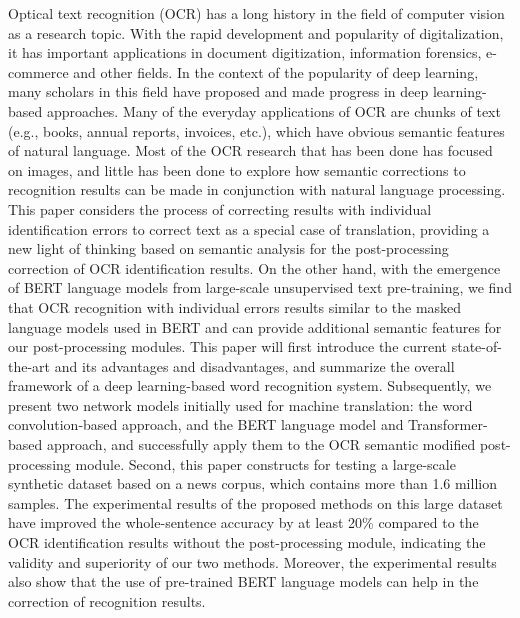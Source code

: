 \begin{englishabstract}
Optical text recognition (OCR) has a long history in the field of computer vision as a research topic.
With the rapid development and popularity of digitalization, it has important applications in document digitization, information forensics, e-commerce and other fields.
In the context of the popularity of deep learning, many scholars in this field have proposed and made progress in deep learning-based approaches.
Many of the everyday applications of OCR are chunks of text (e.g., books, annual reports, invoices, etc.), which have obvious semantic features of natural language.
Most of the OCR research that has been done has focused on images, and little has been done to explore how semantic corrections to recognition results can be made in conjunction with natural language processing.
This paper considers the process of correcting results with individual identification errors to correct text as a special case of translation, providing a new light of thinking based on semantic analysis for the post-processing correction of OCR identification results.
On the other hand, with the emergence of BERT language models from large-scale unsupervised text pre-training, we find that OCR recognition with individual errors results similar to the masked language models used in BERT and can provide additional semantic features for our post-processing modules.
This paper will first introduce the current state-of-the-art and its advantages and disadvantages, and summarize the overall framework of a deep learning-based word recognition system.
Subsequently, we present two network models initially used for machine translation: the word convolution-based approach, and the BERT language model and Transformer-based approach, and successfully apply them to the OCR semantic modified post-processing module.
Second, this paper constructs for testing a large-scale synthetic dataset based on a news corpus, which contains more than 1.6 million samples.
The experimental results of the proposed methods on this large dataset have improved the whole-sentence accuracy by at least 20\% compared to the OCR identification results without the post-processing module, indicating the validity and superiority of our two methods.
Moreover, the experimental results also show that the use of pre-trained BERT language models can help in the correction of recognition results.

\end{englishabstract}
